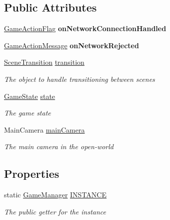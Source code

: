 \subsection*{Public Attributes}
\begin{DoxyCompactItemize}
\item 
\hypertarget{class_game_manager_a87d481fe88a1765f436ea5764cd1a21a}{\hyperlink{class_game_manager_1_1_game_action_flag}{Game\-Action\-Flag} {\bfseries on\-Network\-Connection\-Handled}}\label{class_game_manager_a87d481fe88a1765f436ea5764cd1a21a}

\item 
\hypertarget{class_game_manager_af977df043b83671ab9a4753b90fbf75b}{\hyperlink{class_game_manager_1_1_game_action_message}{Game\-Action\-Message} {\bfseries on\-Network\-Rejected}}\label{class_game_manager_af977df043b83671ab9a4753b90fbf75b}

\item 
\hyperlink{class_scene_transition}{Scene\-Transition} \hyperlink{class_game_manager_abae15982d4eb90ef9e5f3d24d15e22f2}{transition}
\begin{DoxyCompactList}\small\item\em The object to handle transitioning between scenes \end{DoxyCompactList}\item 
\hyperlink{class_game_state}{Game\-State} \hyperlink{class_game_manager_a8d86b330237462e38933b28276ed0e2c}{state}
\begin{DoxyCompactList}\small\item\em The game state \end{DoxyCompactList}\item 
Main\-Camera \hyperlink{class_game_manager_aafd6b83529911d9e32cc4b79bd477d74}{main\-Camera}
\begin{DoxyCompactList}\small\item\em The main camera in the open-\/world \end{DoxyCompactList}\end{DoxyCompactItemize}
\subsection*{Properties}
\begin{DoxyCompactItemize}
\item 
static \hyperlink{class_game_manager}{Game\-Manager} \hyperlink{class_game_manager_a5c1d1f77dd4a2668a47a75c934c87075}{I\-N\-S\-T\-A\-N\-C\-E}
\begin{DoxyCompactList}\small\item\em The public getter for the instance \end{DoxyCompactList}\end{DoxyCompactItemize}
